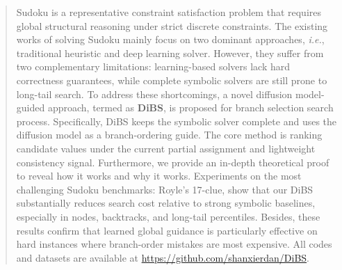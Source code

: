\documentclass[lettersize,journal]{IEEEtran}
\begin{document}
\begin{abstract}

Sudoku is a representative constraint satisfaction problem that requires global structural reasoning under strict discrete constraints.
The existing works of solving Sudoku mainly focus on two dominant approaches, \textit{i.e.}, traditional heuristic and deep learning solver. However, they suffer from two complementary limitations: learning-based solvers lack hard correctness guarantees, while complete symbolic solvers are still prone to long-tail search.
To address these shortcomings, a novel diffusion model-guided approach, termed as \textbf{DiBS}, is proposed for branch selection search process.
Specifically, DiBS keeps the symbolic solver complete and uses the diffusion model as a branch-ordering guide. The core method is ranking candidate values under the current partial assignment and lightweight consistency signal.
Furthermore, we provide an in-depth theoretical proof to reveal how it works and why it works.
Experiments on the most challenging Sudoku benchmarks: Royle's 17-clue, show that our DiBS substantially reduces search cost relative to strong symbolic baselines, especially in nodes, backtracks, and long-tail percentiles. Besides, these results confirm that learned global guidance is particularly effective on hard instances where branch-order mistakes are most expensive.
All codes and datasets are available at \url{https://github.com/shanxierdan/DiBS}.

\end{abstract}
\end{document}
